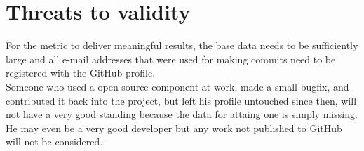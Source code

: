 \section{Threats to validity}\label{sec:threatstovalidity}
For the metric to deliver meaningful results, the base data
needs to be sufficiently large and all e-mail addresses that were used for
making commits need to be registered with the GitHub profile.\\

Someone who used a open-source component at work, made a small bugfix,
and contributed it back into the project, but left his profile untouched
since then, will not have a very good standing because the data
for attaing one is simply missing. He may even be a very good developer
but any work not published to GitHub will not be considered.
